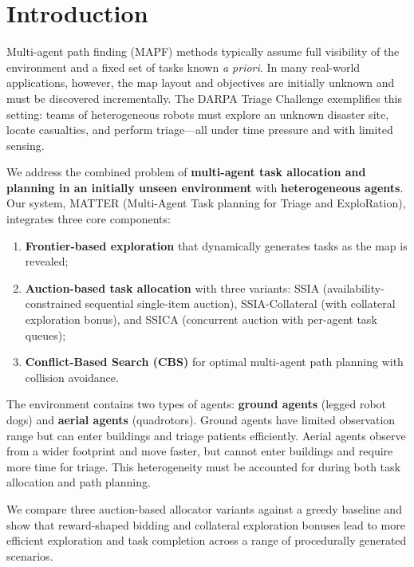 \documentclass[conference]{IEEEtran}
\begin{document}
\section{Introduction}

Multi-agent path finding (MAPF) methods typically assume full visibility of the environment and a fixed set of tasks known \textit{a priori}. In many real-world applications, however, the map layout and objectives are initially unknown and must be discovered incrementally. The DARPA Triage Challenge exemplifies this setting: teams of heterogeneous robots must explore an unknown disaster site, locate casualties, and perform triage---all under time pressure and with limited sensing.

We address the combined problem of \textbf{multi-agent task allocation and planning in an initially unseen environment} with \textbf{heterogeneous agents}. Our system, MATTER (Multi-Agent Task planning for Triage and ExploRation), integrates three core components:
\begin{enumerate}
    \item \textbf{Frontier-based exploration} that dynamically generates tasks as the map is revealed;
    \item \textbf{Auction-based task allocation} with three variants: SSIA (availability-constrained sequential single-item auction), SSIA-Collateral (with collateral exploration bonus), and SSICA (concurrent auction with per-agent task queues);
    \item \textbf{Conflict-Based Search (CBS)} for optimal multi-agent path planning with collision avoidance.
\end{enumerate}

The environment contains two types of agents: \textbf{ground agents} (legged robot dogs) and \textbf{aerial agents} (quadrotors). Ground agents have limited observation range but can enter buildings and triage patients efficiently. Aerial agents observe from a wider footprint and move faster, but cannot enter buildings and require more time for triage. This heterogeneity must be accounted for during both task allocation and path planning.

We compare three auction-based allocator variants against a greedy baseline and show that reward-shaped bidding and collateral exploration bonuses lead to more efficient exploration and task completion across a range of procedurally generated scenarios.
\end{document}
